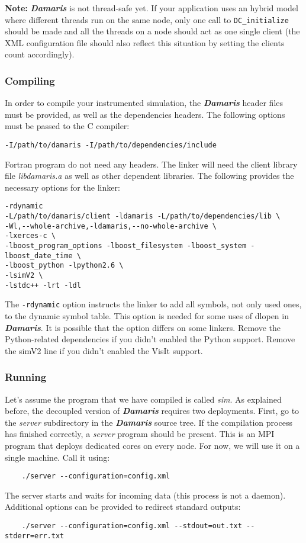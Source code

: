 \documentclass[11pt]{report}
\newcommand{\Damaris}{\emph{\textbf{Damaris}}}
\newcommand{\file}[1]{\emph{#1}}
\newcommand{\function}[1]{\texttt{#1}}
\begin{document}
\textbf{Note:} \Damaris{} is not thread-safe yet. If your application uses an hybrid model
where different threads run on the same node, only one call to \function{DC\_initialize} should be
made and all the threads on a node should act as one single client (the XML configuration file
should also reflect this situation by setting the clients count accordingly).

\subsubsection{Compiling}

In order to compile your instrumented simulation, the \Damaris{} header files must be
provided, as well as the dependencies headers. The following options must be passed to the C compiler:

\begin{verbatim}
-I/path/to/damaris -I/path/to/dependencies/include
\end{verbatim}
Fortran program do not need any headers.
The linker will need the client library file \file{libdamaris.a} as well as other dependent libraries.
The following provides the necessary options for the linker:
\begin{verbatim}
-rdynamic
-L/path/to/damaris/client -ldamaris -L/path/to/dependencies/lib \
-Wl,--whole-archive,-ldamaris,--no-whole-archive \
-lxerces-c \
-lboost_program_options -lboost_filesystem -lboost_system -lboost_date_time \
-lboost_python -lpython2.6 \
-lsimV2 \
-lstdc++ -lrt -ldl
\end{verbatim}

The \texttt{-rdynamic} option instructs the linker to add all symbols, not only used ones, 
to the dynamic symbol table. 
This option is needed for some uses of dlopen in \Damaris{}. It is possible that the option
differs on some linkers.
Remove the Python-related dependencies if you didn't enabled the Python support.
Remove the simV2 line if you didn't enabled the VisIt support.

\subsubsection{Running}

Let's assume the program that we have compiled is called \file{sim}. As explained before,
the decoupled version of \Damaris{} requires two deployments.
First, go to the \file{server} subdirectory in the \Damaris{} source tree. If the compilation process
has finished correctly, a \file{server} program should be present. This is an MPI program that deploys
dedicated cores on every node. For now, we will use it on a single machine.
Call it using:
\begin{verbatim}
	./server --configuration=config.xml
\end{verbatim}
The server starts and waits for incoming data (this process is not a daemon). Additional options can be provided
to redirect standard outputs:
\begin{verbatim}
	./server --configuration=config.xml --stdout=out.txt --stderr=err.txt
\end{verbatim}
\end{document}
